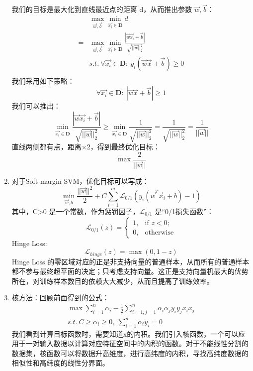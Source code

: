 \documentclass[a4paper,11pt,onecolumn,oneside,UTF8]{article}
\begin{document}
\begin{enumerate}
$$          $$
          我们的目标是最大化到直线最近点的距离 d，从而推出参数 $\vec{w},\vec{b}$：
          $$
              \begin{aligned}
                    & \max\limits_{\vec{w},\vec{b}}\min\limits_{\vec{x_i}\in\mathbf{D}} d                                                         \\
                  = & \max\limits_{\vec{w},\vec{b}}\min\limits_{\vec{x_i}\in\mathbf{D}} \frac{|\vec{w}\vec{x_i}+\vec{b}|}{\sqrt{||\vec{w}||_2^2}} \\
                    & s.t.\ \forall \vec{x_i}\in\mathbf{D}:\ y_i\left(\vec{w}\vec{x}+\vec{b}\right)\geq 0                                         \\
              \end{aligned}
          $$
          我们采用如下策略：
          $$
              \forall \vec{x_i}\in\mathbf{D}:\ |\vec{w}\vec{x}+\vec{b}|\geq 1
          $$
          我们可以推出：
          $$
              \min\limits_{\vec{x_i}\in\mathbf{D}} \frac{|\vec{w}\vec{x_i}+\vec{b}|}{\sqrt{||\vec{w}||_2^2}}\geq \min\limits_{\vec{x_i}\in\mathbf{D}} \frac{1}{\sqrt{||\vec{w}||_2^2}} = \frac{1}{\sqrt{||\vec{w}||_2^2}} = \frac{1}{||\vec{w}||}
          $$
          直线两侧都有点，距离×2，得到最终优化目标：
          $$
              \max \frac{2}{||\vec{w}||}
          $$
    \item
          对于Soft-margin SVM，优化目标可以写成：
          $$
              \min\limits_{\vec{w},b}\frac{||\vec{w}||^2}{2}+C\sum\limits_{i=1}^m \mathscr{L}_{0/1}\left(y_i\left(\vec{w}^T\vec{x}_i+b\right)-1\right)
          $$
          其中，C>0 是一个常数，作为惩罚因子，$\mathscr{L}_{0/1}$ 是“0/1损失函数”：
          $$
              \mathscr{L}_{0/1}\left(z\right) = \left\{\begin{array}{ll}
                  1, & \text{if }z<0;   \\
                  0, & \text{otherwise}
              \end{array}
              \right.
          $$
          Hinge Loss:
          $$
              \mathscr{L}_{hinge}\left(z\right) = \max\left(0,1-z\right)
          $$
          Hinge Loss 的零区域对应的正是非支持向量的普通样本，从而所有的普通样本都不参与最终超平面的决定；只考虑支持向量。这正是支持向量机最大的优势所在，对训练样本数目的依赖大大减少，从而且提高了训练效率。
    \item
          核方法：回顾前面得到的公式：
          $$
              \begin{aligned}
                  \max \sum \limits_{i=1}^n\alpha_i-\frac{1}{2}\sum\limits_{i=1,j=1}^n\alpha_i\alpha_jy_iy_jx_ix_j \\
                  s.t.\ C\geq\alpha_i\geq 0,\ \sum\limits_{i=1}^n\alpha_iy_i=0
              \end{aligned}
          $$
          我们看到计算目标函数时，需要知道x的内积。我们引入核函数，一个可以应用于一对输入数据以计算对应特征空间中的内积的函数。对于不能线性分割的数据集，核函数可以将数据升高维度，进行高纬度的内积，寻找高纬度数据的相似性和高纬度的线性分界面。
\end{enumerate}
\end{document}
